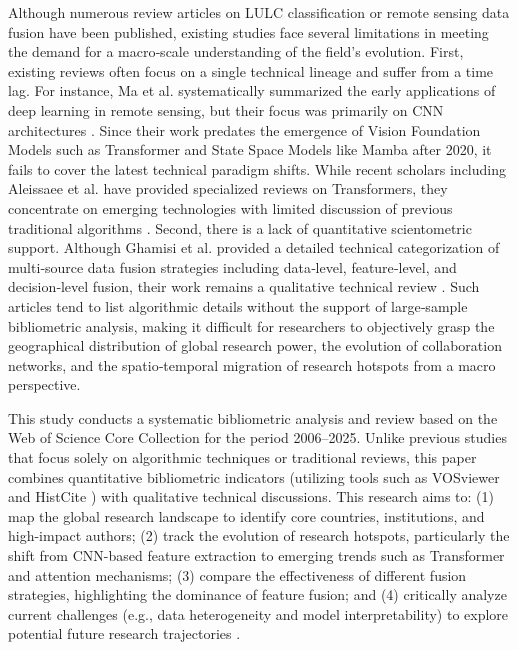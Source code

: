 \documentclass[]{interact}
\theoremstyle{plain}%
\theoremstyle{definition}
\theoremstyle{remark}
\begin{document}
Although numerous review articles on LULC classification or remote sensing data fusion have been published, existing studies face several limitations in meeting the demand for a macro‑scale understanding of the field's evolution. First, existing reviews often focus on a single technical lineage and suffer from a time lag. For instance, Ma et al. systematically summarized the early applications of deep learning in remote sensing, but their focus was primarily on CNN architectures \citep{ma2019deep}. Since their work predates the emergence of Vision Foundation Models such as Transformer and State Space Models like Mamba after 2020, it fails to cover the latest technical paradigm shifts. While recent scholars including Aleissaee et al. have provided specialized reviews on Transformers, they concentrate on emerging technologies with limited discussion of previous traditional algorithms \citep{7}. Second, there is a lack of quantitative scientometric support. Although Ghamisi et al. provided a detailed technical categorization of multi‑source data fusion strategies including data‑level, feature‑level, and decision‑level fusion, their work remains a qualitative technical review \citep{6,7,8}. Such articles tend to list algorithmic details without the support of large‑sample bibliometric analysis, making it difficult for researchers to objectively grasp the geographical distribution of global research power, the evolution of collaboration networks, and the spatio‑temporal migration of research hotspots from a macro perspective.



This study conducts a systematic bibliometric analysis and review based on the Web of Science Core Collection for the period 2006--2025. Unlike previous studies that focus solely on algorithmic techniques or traditional reviews, this paper combines quantitative bibliometric indicators (utilizing tools such as VOSviewer and HistCite \citep{9,10}) with qualitative technical discussions. This research aims to: (1) map the global research landscape to identify core countries, institutions, and high-impact authors; (2) track the evolution of research hotspots, particularly the shift from CNN-based feature extraction to emerging trends such as Transformer and attention mechanisms; (3) compare the effectiveness of different fusion strategies, highlighting the dominance of feature fusion; and (4) critically analyze current challenges (e.g., data heterogeneity and model interpretability) to explore potential future research trajectories \citep{li2024feddiff}.
\end{document}
